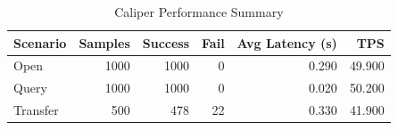 \begin{table}
\caption{Caliper Performance Summary}
\label{tab:caliper_round}
\begin{tabular}{lrrrrr}
\toprule
Scenario & Samples & Success & Fail & Avg Latency (s) & TPS \\
\midrule
Open & 1000 & 1000 & 0 & 0.290 & 49.900 \\
Query & 1000 & 1000 & 0 & 0.020 & 50.200 \\
Transfer & 500 & 478 & 22 & 0.330 & 41.900 \\
\bottomrule
\end{tabular}
\end{table}
